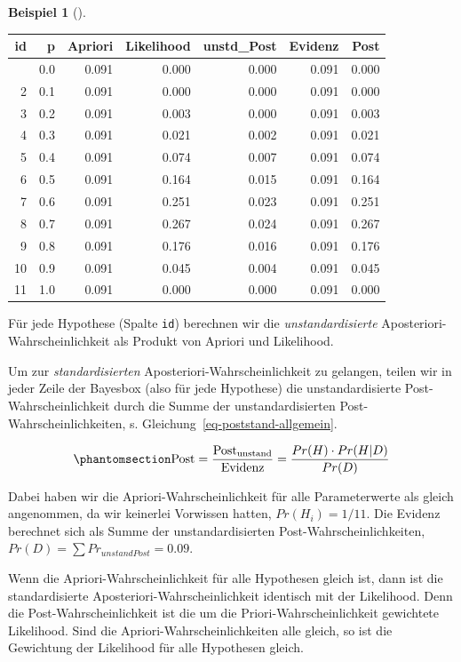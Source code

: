 \documentclass[
  ngerman,
  letterpaper,
  twoside,
  open=any]{scrbook}
\theoremstyle{definition}
\newtheorem{example}{Beispiel}[chapter]
\theoremstyle{plain}
\theoremstyle{definition}
\theoremstyle{definition}
\theoremstyle{remark}
\begin{document}
\begin{example}[]
{\begin{longtable}[]{@{}rrrrrrr@{}}
\toprule\noalign{}
id & p & Apriori & Likelihood & unstd\_Post & Evidenz & Post \\
\midrule\noalign{}
\endhead
\bottomrule\noalign{}
\endlastfoot
1 & 0.0 & 0.091 & 0.000 & 0.000 & 0.091 & 0.000 \\
2 & 0.1 & 0.091 & 0.000 & 0.000 & 0.091 & 0.000 \\
3 & 0.2 & 0.091 & 0.003 & 0.000 & 0.091 & 0.003 \\
4 & 0.3 & 0.091 & 0.021 & 0.002 & 0.091 & 0.021 \\
5 & 0.4 & 0.091 & 0.074 & 0.007 & 0.091 & 0.074 \\
6 & 0.5 & 0.091 & 0.164 & 0.015 & 0.091 & 0.164 \\
7 & 0.6 & 0.091 & 0.251 & 0.023 & 0.091 & 0.251 \\
8 & 0.7 & 0.091 & 0.267 & 0.024 & 0.091 & 0.267 \\
9 & 0.8 & 0.091 & 0.176 & 0.016 & 0.091 & 0.176 \\
10 & 0.9 & 0.091 & 0.045 & 0.004 & 0.091 & 0.045 \\
11 & 1.0 & 0.091 & 0.000 & 0.000 & 0.091 & 0.000 \\

\end{longtable}

}

Für jede Hypothese (Spalte \texttt{id}) berechnen wir die
\emph{unstandardisierte} Aposteriori-Wahrscheinlichkeit als Produkt von
Apriori und Likelihood.

Um zur \emph{standardisierten} Aposteriori-Wahrscheinlichkeit zu
gelangen, teilen wir in jeder Zeile der Bayesbox (also für jede
Hypothese) die unstandardisierte Post-Wahrscheinlichkeit durch die Summe
der unstandardisierten Post-Wahrscheinlichkeiten, s.
Gleichung~\ref{eq-poststand-allgemein}.

\begin{equation}\protect\phantomsection\label{eq-poststand-allgemein}{\text{Post} = \frac{\text{Post}_{\text{unstand}}}{\text{Evidenz}} = \frac{Pr(H) \cdot Pr(H|D)}{Pr(D)}}\end{equation}

Dabei haben wir die Apriori-Wahrscheinlichkeit für alle Parameterwerte
als gleich angenommen, da wir keinerlei Vorwissen hatten,
\(Pr(H_i) = 1/11\). Die Evidenz berechnet sich als Summe der
unstandardisierten Post-Wahrscheinlichkeiten,
\(Pr(D) = \sum Pr_{unstandPost}=0.09\).

Wenn die Apriori-Wahrscheinlichkeit für alle Hypothesen gleich ist, dann
ist die standardisierte Aposteriori-Wahrscheinlichkeit identisch mit der
Likelihood. Denn die Post-Wahrscheinlichkeit ist die um die
Priori-Wahrscheinlichkeit gewichtete Likelihood. Sind die
Apriori-Wahrscheinlichkeiten alle gleich, so ist die Gewichtung der
Likelihood für alle Hypothesen gleich.


\end{example}
\end{document}
